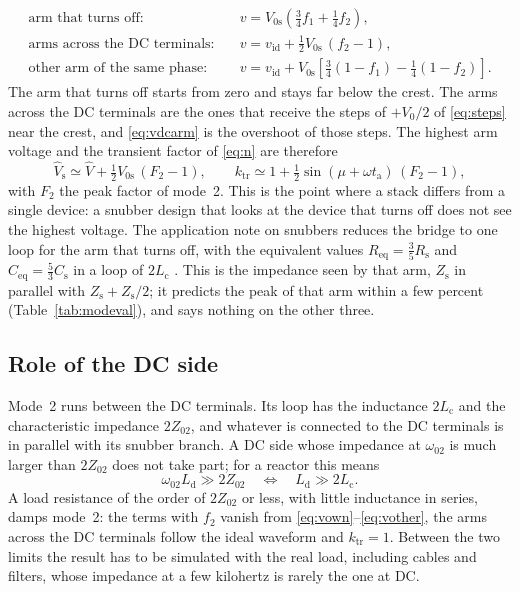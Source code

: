 \documentclass[10pt,a4paper]{scrartcl}
\newcommand{\Cs}{C_\mathrm{s}}
\newcommand{\Rs}{R_\mathrm{s}}
\newcommand{\Zs}{Z_\mathrm{s}}
\newcommand{\Lc}{L_\mathrm{c}}
\newcommand{\Ld}{L_\mathrm{d}}
\newcommand{\Vo}{V_0}
\newcommand{\Vos}{V_\mathrm{0s}}
\newcommand{\Vh}{\hat V}
\newcommand{\Vs}{\hat V_\mathrm{s}}
\newcommand{\ta}{t_\mathrm{a}}
\newcommand{\ktr}{k_\mathrm{tr}}
\begin{document}
\begin{align}
\text{arm that turns off:}\quad & v = \Vos\left(\tfrac34 f_1 + \tfrac14 f_2\right), \label{eq:vown}\\
\text{arms across the DC terminals:}\quad & v = v_\mathrm{id} + \tfrac12\Vos\,(f_2 - 1), \label{eq:vdcarm}\\
\text{other arm of the same phase:}\quad & v = v_\mathrm{id} + \Vos\left[\tfrac34(1 - f_1) - \tfrac14(1 - f_2)\right]. \label{eq:vother}
\end{align}
The arm that turns off starts from zero and stays far below the crest. The arms across the DC terminals are the ones that receive the steps of $+\Vo/2$ of \eqref{eq:steps} near the crest, and \eqref{eq:vdcarm} is the overshoot of those steps. The highest arm voltage and the transient factor of \eqref{eq:n} are therefore
\begin{equation}
\Vs \simeq \Vh + \tfrac12\Vos\,(F_2 - 1), \qquad \ktr \simeq 1 + \tfrac12\sin(\mu + \omega\ta)\,(F_2 - 1) ,
\label{eq:ktr}
\end{equation}
with $F_2$ the peak factor of mode~2. This is the point where a stack differs from a single device: a snubber design that looks at the device that turns off does not see the highest voltage. The application note on snubbers reduces the bridge to one loop for the arm that turns off, with the equivalent values $R_\mathrm{eq} = \tfrac35\Rs$ and $C_\mathrm{eq} = \tfrac53\Cs$ in a loop of $2\Lc$ \cite[Sec.~4.2]{an6481}. This is the impedance seen by that arm, $\Zs$ in parallel with $\Zs + \Zs/2$; it predicts the peak of that arm within a few percent (Table~\ref{tab:modeval}), and says nothing on the other three.

\subsection{Role of the DC side}
\label{sec:dcrole}
Mode~2 runs between the DC terminals. Its loop has the inductance $2\Lc$ and the characteristic impedance $2Z_{02}$, and whatever is connected to the DC terminals is in parallel with its snubber branch. A DC side whose impedance at $\omega_{02}$ is much larger than $2Z_{02}$ does not take part; for a reactor this means
\begin{equation}
\omega_{02}\Ld \gg 2Z_{02} \quad\Longleftrightarrow\quad \Ld \gg 2\Lc .
\label{eq:stiff}
\end{equation}
A load resistance of the order of $2Z_{02}$ or less, with little inductance in series, damps mode~2: the terms with $f_2$ vanish from \eqref{eq:vown}--\eqref{eq:vother}, the arms across the DC terminals follow the ideal waveform and $\ktr = 1$. Between the two limits the result has to be simulated with the real load, including cables and filters, whose impedance at a few kilohertz is rarely the one at DC.
\end{document}
